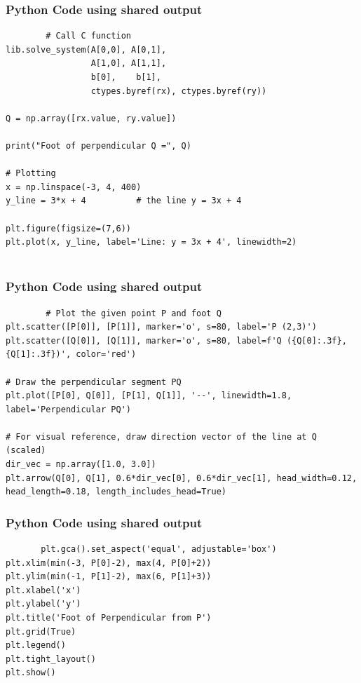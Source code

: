 \documentclass{beamer}
\begin{document}
\begin{frame}[fragile]
  \frametitle{Python Code using shared output}
    \begin{lstlisting}
        # Call C function
lib.solve_system(A[0,0], A[0,1],
                 A[1,0], A[1,1],
                 b[0],    b[1],
                 ctypes.byref(rx), ctypes.byref(ry))

Q = np.array([rx.value, ry.value])

print("Foot of perpendicular Q =", Q)

# Plotting
x = np.linspace(-3, 4, 400)
y_line = 3*x + 4          # the line y = 3x + 4

plt.figure(figsize=(7,6))
plt.plot(x, y_line, label='Line: y = 3x + 4', linewidth=2)


    \end{lstlisting}
\end{frame}
\begin{frame}[fragile]
  \frametitle{Python Code using shared output}
    \begin{lstlisting}
        # Plot the given point P and foot Q
plt.scatter([P[0]], [P[1]], marker='o', s=80, label='P (2,3)')
plt.scatter([Q[0]], [Q[1]], marker='o', s=80, label=f'Q ({Q[0]:.3f}, {Q[1]:.3f})', color='red')

# Draw the perpendicular segment PQ
plt.plot([P[0], Q[0]], [P[1], Q[1]], '--', linewidth=1.8, label='Perpendicular PQ')

# For visual reference, draw direction vector of the line at Q (scaled)
dir_vec = np.array([1.0, 3.0])
plt.arrow(Q[0], Q[1], 0.6*dir_vec[0], 0.6*dir_vec[1], head_width=0.12, head_length=0.18, length_includes_head=True)
    \end{lstlisting}
\end{frame}
\begin{frame}[fragile]
  \frametitle{Python Code using shared output}
    \begin{lstlisting}
       plt.gca().set_aspect('equal', adjustable='box')
plt.xlim(min(-3, P[0]-2), max(4, P[0]+2))
plt.ylim(min(-1, P[1]-2), max(6, P[1]+3))
plt.xlabel('x')
plt.ylabel('y')
plt.title('Foot of Perpendicular from P')
plt.grid(True)
plt.legend()
plt.tight_layout()
plt.show() 
    \end{lstlisting}
\end{frame}
\end{document}
